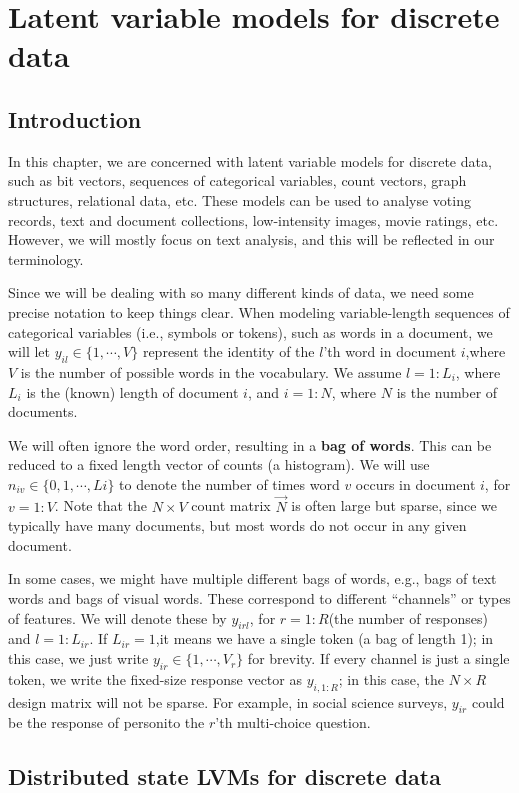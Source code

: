 \chapter{Latent variable models for discrete data}


\section{Introduction}
In this chapter, we are concerned with latent variable models for discrete data, such as bit vectors, sequences of categorical variables, count vectors, graph structures, relational data, etc. These models can be used to analyse voting records, text and document collections, low-intensity images, movie ratings, etc. However, we will mostly focus on text analysis, and this will be reflected in our terminology.

Since we will be dealing with so many different kinds of data, we need some precise notation to keep things clear. When modeling variable-length sequences of categorical variables (i.e., symbols or tokens), such as words in a document, we will let $y_{il} \in \{1,\cdots,V\}$ represent the identity of the $l$'th word in document $i$,where $V$ is the number of possible words in the vocabulary. We assume $l=1:L_i$, where $L_i$ is the (known) length of document $i$, and $i=1:N$, where $N$ is the number of documents.

We will often ignore the word order, resulting in a \textbf{bag of words}. This can be reduced to a fixed length vector of counts (a histogram). We will use $n_{iv} \in \{0,1,\cdots,Li\}$ to denote the number of times word $v$ occurs in document $i$, for $v=1:V$. Note that the $N \times V$ count matrix $\vec{N}$ is often large but sparse, since we typically have many documents, but most words do not occur in any given document.

In some cases, we might have multiple different bags of words, e.g., bags of text words and bags of visual words. These correspond to different “channels” or types of features. We will denote these by $y_{irl}$, for $r=1:R$(the number of responses) and $l=1:L_{ir}$. If $L_{ir} =1$,it means we have a single token (a bag of length 1); in this case, we just write $y_{ir} \in \{1,\cdots,V_r\}$ for brevity. If every channel is just a single token, we write the fixed-size response vector as $y_{i,1:R}$; in this case, the $N \times R$ design matrix  will not be sparse. For example, in social science surveys, $y_{ir}$ could be the response of personito the $r$'th multi-choice question.


\section{Distributed state LVMs for discrete data}

